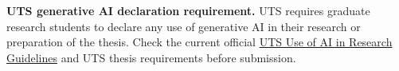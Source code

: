 \medskip
\noindent\textbf{UTS generative AI declaration requirement.}
UTS requires graduate research students to declare any use of generative AI in their
research or preparation of the thesis. Check the current official
\href{https://www.uts.edu.au/about/leadership-governance/policies/a-z/use-of-ai-in-research-guidelines}{UTS Use of AI in Research Guidelines}
and UTS thesis requirements before submission.

